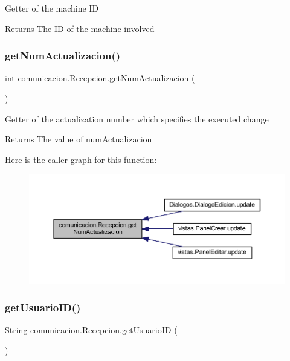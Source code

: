 Getter of the machine ID \begin{DoxyReturn}{Returns}
The ID of the machine involved 
\end{DoxyReturn}
\mbox{\label{classcomunicacion_1_1_recepcion_afa39bd7c5b7b749cb28eb948ee130441}} 
\subsubsection{\texorpdfstring{get\+Num\+Actualizacion()}{getNumActualizacion()}}
{\footnotesize\ttfamily int comunicacion.\+Recepcion.\+get\+Num\+Actualizacion (\begin{DoxyParamCaption}{ }\end{DoxyParamCaption})}

Getter of the actualization number which specifies the executed change \begin{DoxyReturn}{Returns}
The value of num\+Actualizacion 
\end{DoxyReturn}
Here is the caller graph for this function\+:
\nopagebreak
\begin{figure}[H]
\begin{center}
\leavevmode
\includegraphics[width=350pt]{classcomunicacion_1_1_recepcion_afa39bd7c5b7b749cb28eb948ee130441_icgraph}
\end{center}
\end{figure}
\mbox{\label{classcomunicacion_1_1_recepcion_a8beb628d06ac82fdde1ee50157c93bc4}} 
\subsubsection{\texorpdfstring{get\+Usuario\+I\+D()}{getUsuarioID()}}
{\footnotesize\ttfamily String comunicacion.\+Recepcion.\+get\+Usuario\+ID (\begin{DoxyParamCaption}{ }\end{DoxyParamCaption})}

